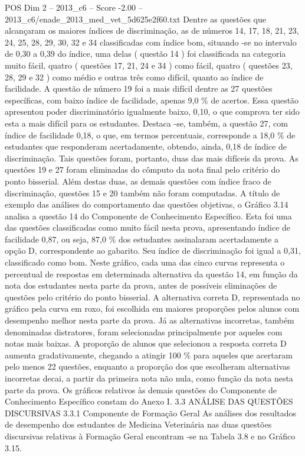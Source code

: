 \begin{textsample}{POS Dim 2 – 2013\_c6 – Score -2.00 – 2013\_c6/enade\_2013\_med\_vet\_5d625e2f60.txt}
Dentre as questões que alcançaram os maiores índices de discriminação, as de números 14, 17, 18, 21, 23, 24, 25, 28, 29, 30, 32 e 34 classificadas com índice bom, situando -se no intervalo de 0,30 a 0,39 do índice, uma delas ( questão 14 ) foi classificada na categoria muito fácil, quatro ( questões 17, 21, 24 e 34 ) como fácil, quatro ( questões 23, 28, 29 e 32 ) como médio e outras três como difícil, quanto ao índice de facilidade.
A questão de número 19 foi a mais difícil dentre as 27 questões específicas, com baixo índice de facilidade, apenas 9,0 \% de acertos.
Essa questão apresentou poder discriminatório igualmente baixo, 0,10, o que comprova ter sido esta a mais difícil para os estudantes.
Destaca -se, também, a questão 27, com índice de facilidade 0,18, o que, em termos percentuais, corresponde a 18,0 \% de estudantes que responderam acertadamente, obtendo, ainda, 0,18 de índice de discriminação.
Tais questões foram, portanto, duas das mais difíceis da prova.
As questões 19 e 27 foram eliminadas do cômputo da nota final pelo critério do ponto bisserial.
Além destas duas, as demais questões com índice fraco de discriminação, questões 15 e 20 também não foram computadas.
A título de exemplo das análises do comportamento das questões objetivas, o Gráfico 3.14 analisa a questão 14 do Componente de Conhecimento Específico.
Esta foi uma das questões classificadas como muito fácil nesta prova, apresentando índice de facilidade 0,87, ou seja, 87,0 \% dos estudantes assinalaram acertadamente a opção D, correspondente ao gabarito.
Seu índice de discriminação foi igual a 0,31, classificado como bom.
Neste gráfico, cada uma das cinco curvas representa o percentual de respostas em determinada alternativa da questão 14, em função da nota dos estudantes nesta parte da prova, antes de possíveis eliminações de questões pelo critério do ponto bisserial.
A alternativa correta D, representada no gráfico pela curva em roxo, foi escolhida em maiores proporções pelos alunos com desempenho melhor nesta parte da prova.
Já as alternativas incorretas, também denominadas distratores, foram selecionadas principalmente por aqueles com notas mais baixas.
A proporção de alunos que selecionou a resposta correta D aumenta gradativamente, chegando a atingir 100 \% para aqueles que acertaram pelo menos 22 questões, enquanto a proporção dos que escolheram alternativas incorretas decai, a partir da primeira nota não nula, como função da nota nesta parte da prova.
Os gráficos relativos às demais questões do Componente de Conhecimento Específico constam do Anexo I. 3.3 ANÁLISE DAS QUESTÕES DISCURSIVAS 3.3.1 Componente de Formação Geral As análises dos resultados de desempenho dos estudantes de Medicina Veterinária nas duas questões discursivas relativas à Formação Geral encontram -se na Tabela 3.8 e no Gráfico 3.15.

\end{textsample}

